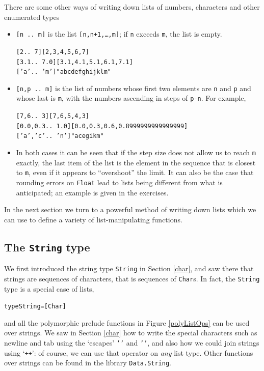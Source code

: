 There are some other ways of writing down lists of numbers, characters and other enumerated
types 
\begin{itemize}
\item \texttt{[n ..\ m]} is the list \texttt{[n,n+1,\ldots,m]}; if 
\texttt{n} exceeds \texttt{m}, the list is empty.
\begin{alltt}
[2 ..\ 7]     \step{}[2,3,4,5,6,7]
[3.1 ..\ 7.0] \step{}[3.1,4.1,5.1,6.1,7.1]
['a' ..\ 'm'] \step{}"abcdefghijklm"
\end{alltt}
\item \texttt{[n,p ..\ m]} is the list of numbers whose first two elements are \texttt{n} and
\texttt{p} and whose last is \texttt{m}, with the numbers ascending in steps
of \texttt{p-n}. For example,
\begin{alltt}
[7,6 ..\ 3]       \step{}[7,6,5,4,3]
[0.0,0.3 ..\ 1.0] \step{}[0.0,0.3,0.6,0.8999999999999999]
['a','c' ..\ 'n'] \step{}"acegikm"
\end{alltt}
\item In both cases it can be seen that if the step size does not allow us to
reach \texttt{m} exactly, the last item of the list is the element in the
sequence that is closest to \texttt{m}, even if it appears to ``overshoot'' the limit. It can also
be the case that rounding errors on \texttt{Float} lead to lists being
different from what is anticipated; an example is given in the
exercises.
\end{itemize}
In the next section we turn to a powerful method of writing down lists which we can use to define
a variety of list-manipulating functions. 

\subsection*{The \texttt{String} type}

We first introduced the string type \texttt{String} in Section \ref{char}, and saw there that strings are sequences of characters, that is sequences of \texttt{Char}s. In fact, the \texttt{String} type is a special case of lists, 
\begin{alltt}
type String = [Char]
\end{alltt}
and all the polymorphic prelude functions in Figure \ref{polyListOps}
can be used over strings. We saw in Section \ref{char} how to write
the special characters such as newline and tab using the `escapes'
\texttt{''} and \texttt{''}, and also how we could join strings using `\texttt{++}': of course, we can use that operator on \emph{any} list type. 
Other functions over strings can be found in the library \texttt{Data.String}.

